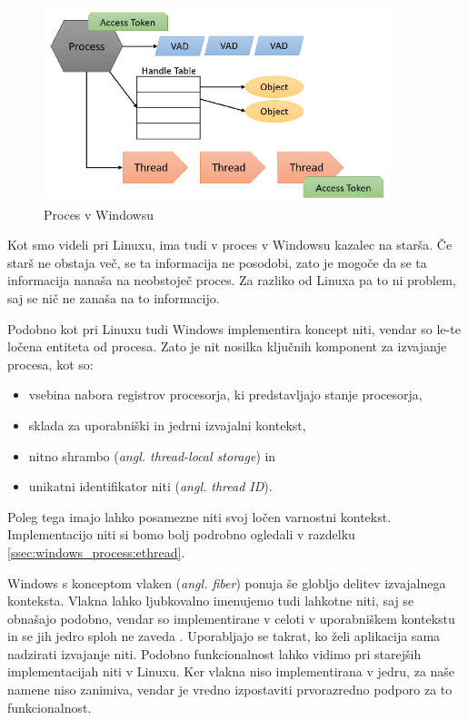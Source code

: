 \documentclass[a4paper,12pt,openright]{book}
\begin{document}
\begin{figure}[h!]
	\begin{center}
		\includegraphics[width=0.9\textwidth]{images/windows_process.png}
	\end{center}
	\caption{Proces v Windowsu \cite{Yosifovich_Russinovich_Solomon_Ionescu_2017}}
	\label{fig:windows_process}
\end{figure}

Kot smo videli pri Linuxu, ima tudi v proces v Windowsu kazalec na starša.
Če starš ne obstaja več, se ta informacija ne posodobi, zato je mogoče da se ta informacija nanaša na neobstoječ proces.
Za razliko od Linuxa pa to ni problem, saj se nič ne zanaša na to informacijo.

Podobno kot pri Linuxu tudi Windows implementira koncept niti, vendar so le-te ločena entiteta od procesa.
Zato je nit nosilka ključnih komponent za izvajanje procesa, kot so:
\begin{itemize}
	\item vsebina nabora registrov procesorja, ki predstavljajo stanje procesorja,
	\item sklada za uporabniški in jedrni izvajalni kontekst,
	\item nitno shrambo (\textit{angl. thread-local storage}) in
	\item unikatni identifikator niti (\textit{angl. thread ID}).
\end{itemize}
Poleg tega imajo lahko posamezne niti svoj ločen varnostni kontekst.
Implementacijo niti si bomo bolj podrobno ogledali v razdelku \ref{ssec:windows_process:ethread}.

Windows s konceptom vlaken (\textit{angl. fiber}) ponuja še globljo delitev izvajalnega konteksta.
Vlakna lahko ljubkovalno imenujemo tudi lahkotne niti, saj se obnašajo podobno, vendar so implementirane v celoti v uporabniškem kontekstu in se jih jedro sploh ne zaveda \cite{Yosifovich_Russinovich_Solomon_Ionescu_2017}.
Uporabljajo se takrat, ko želi aplikacija sama nadzirati izvajanje niti.
Podobno funkcionalnost lahko vidimo pri starejših implementacijah niti v Linuxu.
Ker vlakna niso implementirana v jedru, za naše namene niso zanimiva, vendar je vredno izpostaviti prvorazredno podporo za to funkcionalnost.
\end{document}
